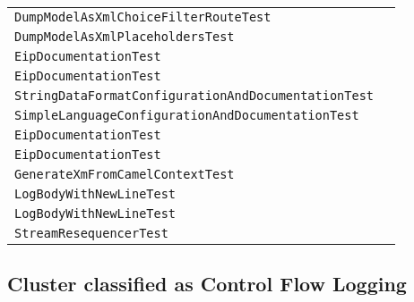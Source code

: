 \begin{center}
\begin{tabular}{ll}
\lstinline/DumpModelAsXmlChoiceFilterRouteTest/&\raisebox{0pt}{\lstinline/testDumpModelAsXmAl()/}\\
\lstinline/DumpModelAsXmlPlaceholdersTest/&\raisebox{0pt}{\lstinline/testDumpModelAsXml()/}\\
\lstinline/EipDocumentationTest/&\raisebox{0pt}{\lstinline/testFailOverDocumentation()/}\\
\lstinline/EipDocumentationTest/&\raisebox{0pt}{\lstinline/testSimpleDocumentation()/}\\
\lstinline/StringDataFormatConfigurationAndDocumentationTest/&\raisebox{0pt}{\lstinline/DataFormatJsonSchema()/}\\
\lstinline/SimpleLanguageConfigurationAndDocumentationTest/&\raisebox{0pt}{\lstinline/LanguageJsonSchema()/}\\
\lstinline/EipDocumentationTest/&\raisebox{0pt}{\lstinline/testDocumentation()/}\\
\lstinline/EipDocumentationTest/&\raisebox{0pt}{\lstinline/testSplitDocumentation()/}\\
\lstinline/GenerateXmFromCamelContextTest/&\raisebox{0pt}{\lstinline/testCreateRouteFromCamelContext()/}\\
\lstinline/LogBodyWithNewLineTest/&\raisebox{0pt}{\lstinline/testNoSkip()/}\\
\lstinline/LogBodyWithNewLineTest/&\raisebox{0pt}{\lstinline/testSkip()/}\\
\lstinline/StreamResequencerTest/&\raisebox{0pt}{\lstinline/booleanuseJmx()/}\\

\bottomrule
\end{tabular}
\end{center}

\subsection{Cluster classified as Control Flow Logging}

